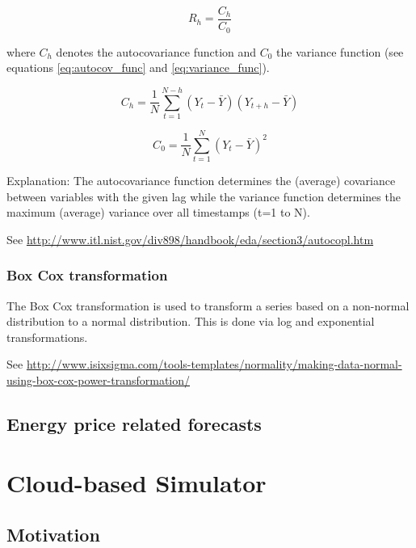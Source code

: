 \begin{equation}
R_h = \frac{C_h}{C_0}
\label{eq:autocorr_coeff}
\end{equation}


where $C_h$ denotes the autocovariance function and $C_0$ the variance function 
(see equations \ref{eq:autocov_func} and \ref{eq:variance_func}). 


\begin{equation}
C_h = \frac{1}{N} \sum\limits_{t=1}^{N-h} (Y_t - \bar{Y}) (Y_{t+h} - \bar{Y})
\label{eq:autocov_func}
\end{equation}


\begin{equation}
C_0 = \frac{1}{N} \sum\limits_{t=1}^{N} (Y_t - \bar{Y})^2
\label{eq:variance_func}
\end{equation}


Explanation: The autocovariance function determines the (average) covariance between variables with the given lag while the variance function determines the maximum (average) variance over all timestamps (t=1 to N). 


See \url{http://www.itl.nist.gov/div898/handbook/eda/section3/autocopl.htm}


\subsubsection{Box Cox transformation}

The Box Cox transformation is used to transform a series based on a non-normal distribution to a normal distribution. This is done via log and exponential transformations. 

See \url{http://www.isixsigma.com/tools-templates/normality/making-data-normal-using-box-cox-power-transformation/}



\subsection{Energy price related forecasts}



\section{Cloud-based Simulator}


\subsection{Motivation}

